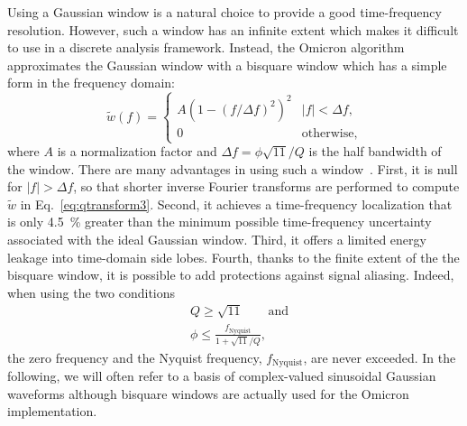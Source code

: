 Using a Gaussian window is a natural choice to provide a good time-frequency resolution. However, such a window has an infinite extent which makes it difficult to use in a discrete analysis framework. Instead, the Omicron algorithm approximates the Gaussian window with a bisquare window which has a simple form in the frequency domain:
\begin{equation}
  \tilde{w}(f) = 
  \begin{cases}
    A\left(1 - (f/\Delta f)^2 \right)^2 & |f| < \Delta f, \\
    0 & \textrm{otherwise},
  \end{cases}
  \label{eq:bisquare}
\end{equation}
where $A$ is a normalization factor and $\Delta f=\phi\sqrt{11}/Q$ is the half bandwidth of the window. There are many advantages in using such a window~\cite{Chatterji:2004}. First, it is null for $|f| > \Delta f$, so that shorter inverse Fourier transforms are performed to compute $\tilde{w}$ in Eq.~\ref{eq:qtransform3}. Second, it achieves a time-frequency localization that is only 4.5~\% greater than the minimum possible time-frequency uncertainty associated with the ideal Gaussian window. Third, it offers a limited energy leakage into time-domain side lobes. Fourth, thanks to the finite extent of the the bisquare window, it is possible to add protections against signal aliasing. Indeed, when using the two conditions
\begin{align}
  &Q\ge\sqrt{11} \qquad \text{and}\label{eq:antialias1} \\
  &\phi \le \frac{f_{\text{Nyquist}}}{1+\sqrt{11}/Q}, \label{eq:antialias2}
\end{align}
the zero frequency and the Nyquist frequency, $f_{\text{Nyquist}}$, are never exceeded.
In the following, we will often refer to a basis of complex-valued sinusoidal Gaussian waveforms although bisquare windows are actually used for the Omicron implementation.


